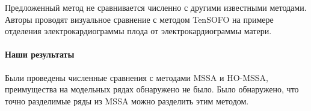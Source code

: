 \documentclass[12pt]{article}
\theoremstyle{plain}
\theoremstyle{definition}
\theoremstyle{remark}
\begin{document}
Предложенный метод не сравнивается численно с другими известными методами.
Авторы проводят визуальное сравнение с методом TenSOFO на примере отделения
электрокардиограммы плода от электрокардиограммы матери.

\paragraph{Наши результаты} Были проведены численные сравнения с
методами MSSA и HO-MSSA, преимущества на модельных рядах обнаружено не было.
Было обнаружено, что точно разделимые ряды из MSSA можно разделить этим методом.
\end{document}
